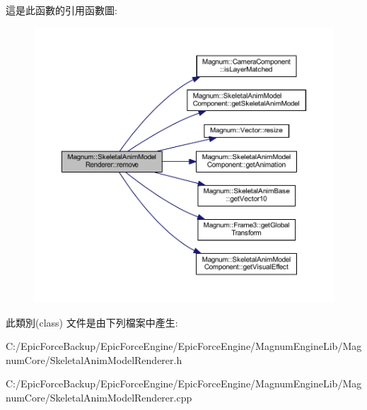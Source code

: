 這是此函數的引用函數圖\+:\nopagebreak
\begin{figure}[H]
\begin{center}
\leavevmode
\includegraphics[width=350pt]{class_magnum_1_1_skeletal_anim_model_renderer_a138ac08d14815bdc63a73b2d0722f52f_cgraph}
\end{center}
\end{figure}




此類別(class) 文件是由下列檔案中產生\+:\begin{DoxyCompactItemize}
\item 
C\+:/\+Epic\+Force\+Backup/\+Epic\+Force\+Engine/\+Epic\+Force\+Engine/\+Magnum\+Engine\+Lib/\+Magnum\+Core/Skeletal\+Anim\+Model\+Renderer.\+h\item 
C\+:/\+Epic\+Force\+Backup/\+Epic\+Force\+Engine/\+Epic\+Force\+Engine/\+Magnum\+Engine\+Lib/\+Magnum\+Core/Skeletal\+Anim\+Model\+Renderer.\+cpp\end{DoxyCompactItemize}
